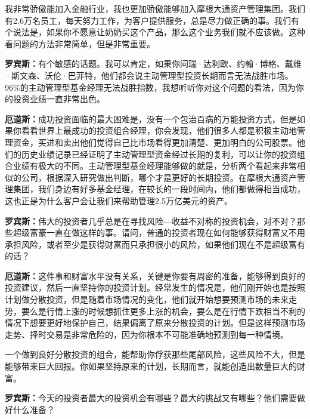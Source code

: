我非常骄傲能加入金融行业，我也更加骄傲能够加入摩根大通资产管理集团。我们有2.6万名员工，每天努力工作，为客户提供服务，总是尽力做正确的事。我们有个说法是，如果你不愿意让奶奶买这个产品，那么这个业务我们就不应该做。这种看问题的方法非常简单，但是非常重要。

\begin{BookQuote}
\textbf{罗宾斯：}有个敏感的话题。我可以肯定，如果你问瑞·达利欧、约翰·博格、戴维·斯文森、沃伦·巴菲特，他们都会说主动管理型投资长期而言无法战胜市场。96\%的主动管理型基金经理无法战胜指数，我想听听你对这个问题的看法，因为你的投资业绩一直非常出色。
\end{BookQuote}

\begin{BookQuote}
\textbf{厄道斯：}成功投资面临的最大困难是，没有一个包治百病的万能投资方式，但是如果你看看世界上最成功的投资组合经理，你会发现，他们很多人都是积极主动地管理资金，买进和卖出他们觉得自己比市场看得更加清楚、更加明白的公司股票。他们的历史业绩记录已经证明了主动管理型资金经过长期的复利，可以让你的投资组合业绩有极大的不同。主动管理型基金经理能够做的就是，分析两个看起来非常相似的公司，根据深入研究做出判断，哪个才是更好的长期投资。在摩根大通资产管理集团，我们身边有好多基金经理，在较长的一段时间内，他们都做得相当成功，这也正是为什么客户会让我们来帮助管理2.5万亿美元的资产。
\end{BookQuote}

\begin{BookQuote}
\textbf{罗宾斯：}伟大的投资者几乎总是在寻找风险—收益不对称的投资机会，对不对？那些超级富豪一直在做这样的事。请问，普通的投资者现在如何能够获得财富又不用承担风险，或者至少是获得财富而只承担很小的风险，如果他们现在不是超级富有的话？
\end{BookQuote}

\begin{BookQuote}
\textbf{厄道斯：}这件事和财富水平没有关系，关键是你要有周密的准备，能够得到良好的投资建议，然后一直坚持你的投资计划。经常发生的情况是，他们刚开始也是按照计划做分散投资，但是随着市场情况的变化，他们就开始想要预测市场的未来走势，要么是行情上涨的时候想抓住更多上涨的机会，要么是在行情下跌相当不利的情况下想要更好地保护自己，结果偏离了原来分散投资的计划。但是这样预测市场走势、择时交易是非常危险的，因为你根本不可能准确地预测到每一种情境。
\end{BookQuote}

一个做到良好分散投资的组合，能帮助你俘获那些尾部风险，这些风险不大，但是能够带来巨大回报。你如果坚持原来的计划，长期而言，就能创造出数量巨大的财富。

\begin{BookQuote}
\textbf{罗宾斯：}今天的投资者最大的投资机会有哪些？最大的挑战又有哪些？他们需要做好什么准备？
\end{BookQuote}

